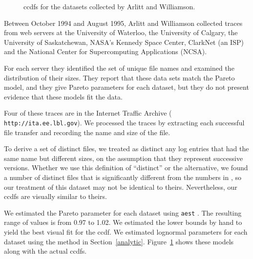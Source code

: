 \documentclass[10pt,twocolumn]{article}
\begin{document}
\begin{figure}[p]
\centerline{}
\vspace{0.2in}
\centerline{}
\vspace{0.2in}
\centerline{}
\vspace{0.2in}
\centerline{}
\caption{ccdfs for the datasets collected by Arlitt and Williamson.}
\label{fig.carey}
\end{figure}


Between October 1994 and August 1995, Arlitt and Williamson
\cite{ArlittWilliamson96} collected traces from web servers at the
University of Waterloo, the University of Calgary, the University of
Saskatchewan, NASA's Kennedy Space Center, ClarkNet (an ISP) and the
National Center for Supercomputing Applications (NCSA).

For each server they identified the set of unique file names
and examined the distribution of their sizes.  They report that these
data sets match the Pareto model, and they give Pareto parameters
for each dataset, but they do not 
present evidence that these models fit the data.

Four of these traces are in the Internet Traffic Archive ({\tt
http://ita.ee.lbl.gov}).  We processed the traces by extracting each
successful file transfer and recording the name and size of the file.

To derive a set of distinct files, we treated as distinct any
log entries that had the same name but different sizes, on the
assumption that they represent successive versions.  Whether we use
this definition of ``distinct'' or the alternative, we found a
number of distinct files that is significantly different from the numbers
in \cite{ArlittWilliamson96}, so our treatment of this dataset may
not be identical to theirs.  Nevertheless, our ccdfs are visually
similar to theirs.

We estimated the Pareto parameter for each dataset using 
{\tt aest} \cite{CrovellaTaqqu99}.
The resulting range of values is from 0.97 to 1.02.
We estimated the lower bounds by hand to yield the best
visual fit for the ccdf.
We estimated lognormal parameters for each dataset using the
method in Section~\ref{analytic}.
Figure~\ref{fig.carey} shows these models along with the actual ccdfs.
\end{document}
